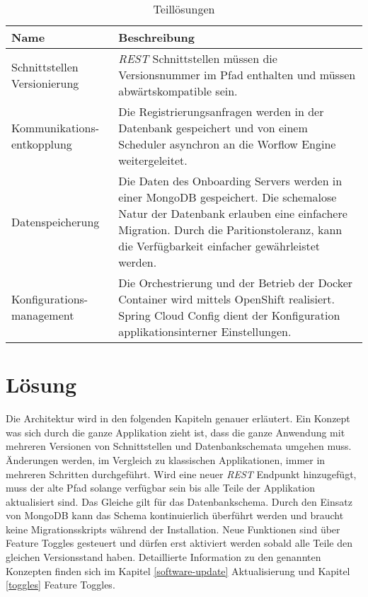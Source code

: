 \begin{table}[H]
	\centering
	\caption{Teillösungen}
	\begin{tabular}{ | p{4cm} | p{11cm} | }
		\toprule
		{\textbf{Name}} & {\textbf{Beschreibung}} \\
		\midrule
		Schnittstellen Versionierung & \textit{\gls{REST}} Schnittstellen müssen die Versionsnummer im Pfad enthalten und müssen abwärtskompatible sein.\\ \hline
		Kommunikations- entkopplung &  Die Registrierungsanfragen werden in der Datenbank gespeichert und von einem Scheduler asynchron an die Worflow Engine weitergeleitet.\\ \hline
		Datenspeicherung & Die Daten des Onboarding Servers werden in einer MongoDB gespeichert. Die schemalose Natur der Datenbank erlauben eine einfachere Migration. Durch die Paritionstoleranz, kann die Verfügbarkeit einfacher gewährleistet werden.\\ \hline
		Konfigurations- management &  Die Orchestrierung und der Betrieb der Docker Container wird mittels OpenShift realisiert. Spring Cloud Config dient der Konfiguration applikationsinterner Einstellungen.\\
		\bottomrule
	\end{tabular}
\end{table}

\section{Lösung}

Die Architektur wird in den folgenden Kapiteln genauer erläutert. Ein Konzept was sich durch die ganze Applikation zieht ist, dass die ganze Anwendung mit mehreren Versionen von Schnittstellen und Datenbankschemata umgehen muss. Änderungen werden, im Vergleich zu klassischen Applikationen, immer in mehreren Schritten durchgeführt. Wird eine neuer \textit{\gls{REST}} Endpunkt hinzugefügt, muss der alte Pfad solange verfügbar sein bis alle Teile der Applikation aktualisiert sind. Das Gleiche gilt für das Datenbankschema. Durch den Einsatz von MongoDB kann das Schema kontinuierlich überführt werden und braucht keine Migrationsskripts während der Installation. Neue Funktionen sind über Feature Toggles gesteuert und dürfen erst aktiviert werden sobald alle Teile den gleichen Versionsstand haben. Detaillierte Information zu den genannten Konzepten finden sich im Kapitel \ref{software-update} Aktualisierung und Kapitel \ref{toggles} Feature Toggles.
\newpage